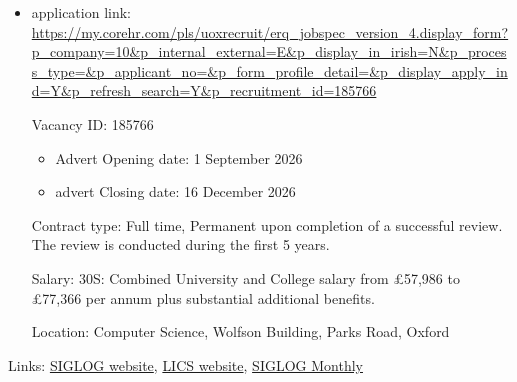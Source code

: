 \documentclass[prodmode,acmtecs]{acmsmall} %
\begin{document}
\begin{itemize}\item  application link: \href{https://my.corehr.com/pls/uoxrecruit/erq_jobspec_version_4.display_form?p_company=10\&p_internal_external=E\&p_display_in_irish=N\&p_process_type=\&p_applicant_no=\&p_form_profile_detail=\&p_display_apply_ind=Y\&p_refresh_search=Y\&p_recruitment_id=185766}{https://my.corehr.com/pls/uoxrecruit/erq\_jobspec\_version\_4.display\_form?p\_company=10\&p\_internal\_external=E\&p\_display\_in\_irish=N\&p\_process\_type=\&p\_applicant\_no=\&p\_form\_profile\_detail=\&p\_display\_apply\_ind=Y\&p\_refresh\_search=Y\&p\_recruitment\_id=185766} 
 
  Vacancy ID: 185766 
 
\begin{itemize}\item  Advert Opening date: 1 September 2026
\item  advert Closing date: 16 December 2026
\end{itemize} 
  Contract type: Full time, Permanent upon completion of a successful review. The review is conducted during the first 5 years. 
 
  Salary: 30S: Combined University and College salary from £57,986 to £77,366 per annum plus substantial additional benefits. 
 
  Location: Computer Science, Wolfson Building, Parks Road, Oxford 
 
\end{itemize}


\bigskip Links: \href{http://siglog.org/}{SIGLOG website}, \href{https://lics.siglog.org}{LICS website}, \href{https://lics.siglog.org/newsletters/}{SIGLOG Monthly}
\end{document}
